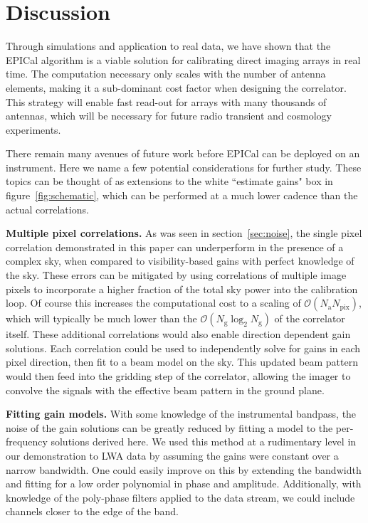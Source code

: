 \documentclass[a4paper,fleqn,usenatbib]{../mnras}
\newcommand{\Nant}{\ensuremath{N_{\mathrm{a}}}}
\newcommand{\Ng}{\ensuremath{N_{\mathrm{g}}}}
\begin{document}
\section{Discussion}\label{sec:discussion}
Through simulations and application to real data, we have shown that the EPICal algorithm is a viable solution for calibrating direct imaging arrays in real time. The computation necessary only scales with the number of antenna elements, making it a sub-dominant cost factor when designing the correlator. This strategy will enable fast read-out for arrays with many thousands of antennas, which will be necessary for future radio transient and cosmology experiments.

There remain many avenues of future work before EPICal can be deployed on an instrument. Here we name a few potential considerations for further study. These topics can be thought of as extensions to the white ``estimate gains" box in figure~\ref{fig:schematic}, which can be performed at a much lower cadence than the actual correlations.

\textbf{Multiple pixel correlations.} As was seen in section~\ref{sec:noise}, the single pixel correlation demonstrated in this paper can underperform in the presence of a complex sky, when compared to visibility-based gains with perfect knowledge of the sky. These errors can be mitigated by using correlations of multiple image pixels to incorporate a higher fraction of the total sky power into the calibration loop. Of course this increases the computational cost to a scaling of $\mathcal{O}(\Nant N_{\mathrm{pix}})$, which will typically be much lower than the $\mathcal{O}(\Ng \log_2 \Ng)$ of the correlator itself. These additional correlations would also enable direction dependent gain solutions. Each correlation could be used to independently solve for gains in each pixel direction, then fit to a beam model on the sky. This updated beam pattern would then feed into the gridding step of the correlator, allowing the imager to convolve the signals with the effective beam pattern in the ground plane. 

\textbf{Fitting gain models.} With some knowledge of the instrumental bandpass, the noise of the gain solutions can be greatly reduced by fitting a model to the per-frequency solutions derived here. We used this method at a rudimentary level in our demonstration to LWA data by assuming the gains were constant over a narrow bandwidth. One could easily improve on this by extending the bandwidth and fitting for a low order polynomial in phase and amplitude. Additionally, with knowledge of the poly-phase filters applied to the data stream, we could include channels closer to the edge of the band.
\end{document}
